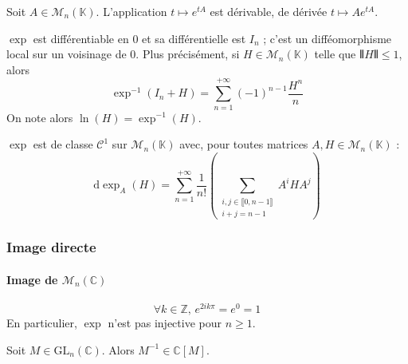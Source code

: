 
  \begin{proposition}
    Soit $A \in \mathcal{M}_n(\mathbb{K})$. L'application $t \mapsto e^{tA}$ est dérivable, de dérivée $t \mapsto Ae^{tA}$.
  \end{proposition}


  \begin{proposition}
    \label{155-1}
    $\exp$ est différentiable en $0$ et sa différentielle est $I_n$ ; c'est un difféomorphisme local sur un voisinage de $0$. Plus précisément, si $H \in \mathcal{M}_n(\mathbb{K})$ telle que $\VERT H \VERT \leq 1$, alors
    \[ \exp^{-1}(I_n + H) = \sum_{n=1}^{+\infty} (-1)^{n-1} \frac{H^n}{n} \]
    On note alors $\ln(H) = \exp^{-1}(H)$.
  \end{proposition}


  \begin{theorem}
    $\exp$ est de classe $\mathcal{C}^1$ sur $\mathcal{M}_n(\mathbb{K})$ avec, pour toutes matrices $A, H \in \mathcal{M}_n(\mathbb{K})$ :
    \[ \mathrm{d}\exp_A(H) = \sum_{n=1}^{+\infty} \frac{1}{n!} \left( \sum_{\substack{i,j \in \llbracket 0, n-1 \rrbracket \\ i+j = n-1}} A^i H A^j \right) \]
  \end{theorem}

  \subsubsection{Image directe}

  \paragraph{Image de \texorpdfstring{$\mathcal{M}_n(\mathbb{C})$}{Mₙ(C)}}


  \begin{example}
    \[ \forall k \in \mathbb{Z}, \, e^{2ik\pi} = e^0 = 1 \]
    En particulier, $\exp$ n'est pas injective pour $n \geq 1$.
  \end{example}


  \begin{lemma}
    Soit $M \in \mathrm{GL}_n(\mathbb{C})$. Alors $M^{-1} \in \mathbb{C}[M]$.
  \end{lemma}

